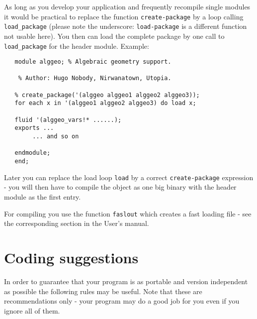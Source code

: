 \documentclass[11pt]{article}
\begin{document}
As long as you develop your
application and frequently recompile single modules
it would be practical to replace the function
\texttt{create-package} by a loop calling \texttt{load\_package} (please
note the underscore: \texttt{load-package} is a different
function not usable here). You then can load the complete package
by one call to \texttt{load\_package} for the header
module. Example:

\begin{verbatim}
   module alggeo; % Algebraic geometry support.

    % Author: Hugo Nobody, Nirwanatown, Utopia.

   % create_package('(alggeo alggeo1 alggeo2 alggeo3));
   for each x in '(alggeo1 alggeo2 alggeo3) do load x;

   fluid '(alggeo_vars!* ......);
   exports ...
        ... and so on

   endmodule;
   end;
\end{verbatim}
Later you can replace the load loop \texttt{load} by a correct
\texttt{create-package} expression - you will then have to compile the
object as one big binary with the header module as the first
entry.

For compiling you use the function \texttt{faslout} which creates
a fast loading file - see the corresponding section in the User's
manual.
\section{Coding suggestions}

In order to guarantee that your program is as portable
and version independent as possible
the following rules may be useful. Note that these are recommendations
only - your program may do a good job for you even if
you ignore all of them.
\end{document}
